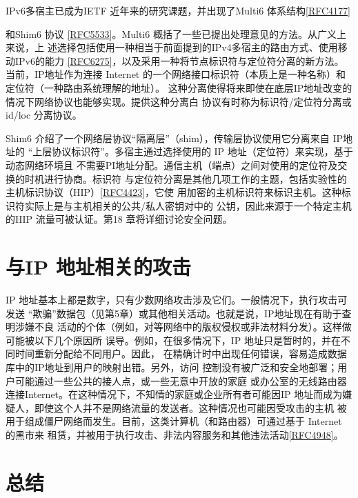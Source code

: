 IPv6多宿主已成为IETF 近年来的研究课题，并出现了Multi6 体系结构\href{https://www.rfc-editor.org/rfc/rfc4177}{[RFC4177]}

和Shim6 协议 \href{https://www.rfc-editor.org/rfc/rfc5533}{[RFC5533]}。Multi6 概括了一些已提出处理意见的方法。从广义上来说，上
述选择包括使用一种相当于前面提到的IPv4多宿主的路由方式、使用移动IPv6的能力
\href{https://www.rfc-editor.org/rfc/rfc6275}{[RFC6275]}，以及采用一种将节点标识符与定位符分离的新方法。当前，IP地址作为连接
Internet 的一个网络接口标识符（本质上是一种名称）和定位符（一种路由系统理解的地址）。
这种分离使得将来即使在底层IP地址改变的情况下网络协议也能够实现。提供这种分离白
协议有时称为标识符/定位符分离或id/loc 分离协议。

Shim6 介绍了一个网络层协议“隔离层”（shim），传输层协议使用它分离来自 IP地址的
“上层协议标识符”。多宿主通过选择使用的 IP 地址（定位符）来实现，基于动态网络环境且
不需要PI地址分配。通信主机（端点）之间对使用的定位符及交换的时机进行协商。标识符
与定位符分离是其他几项工作的主题，包括实验性的主机标识协议（HIP）\href{https://www.rfc-editor.org/rfc/rfc4423}{[RFC4423]}，它使
用加密的主机标识符来标识主机。这种标识符实际上是与主机相关的公共/私人密钥对中的
公钥，因此来源于一个特定主机的HIP 流量可被认证。第18 章将详细讨论安全问题。

\section{与IP 地址相关的攻击}

IP 地址基本上都是数字，只有少数网络攻击涉及它们。一般情况下，执行攻击可发送
“欺骗”数据包（见第5章）或其他相关活动。也就是说，IP地址现在有助于查明涉嫌不良
活动的个体（例如，对等网络中的版权侵权或非法材料分发）。这样做可能被以下几个原因所
误导。例如，在很多情况下，IP 地址只是暂时的，并在不同时间重新分配给不同用户。因此，
在精确计时中出现任何错误，容易造成数据库中的IP地址到用户的映射出错。另外，访问
控制没有被广泛和安全地部署；用户可能通过一些公共的接人点，或一些无意中开放的家庭
或办公室的无线路由器连接Internet。在这种情况下，不知情的家庭或企业所有者可能因IP
地址而成为嫌疑人，即使这个人并不是网络流量的发送者。这种情况也可能因受攻击的主机
被用于组成僵尸网络而发生。目前，这类计算机（和路由器）可通过基于 Internet 的黑市来
租赁，并被用于执行攻击、非法内容服务和其他违法活动\href{https://www.rfc-editor.org/rfc/rfc4948}{[RFC4948]}。

\section{总结}

